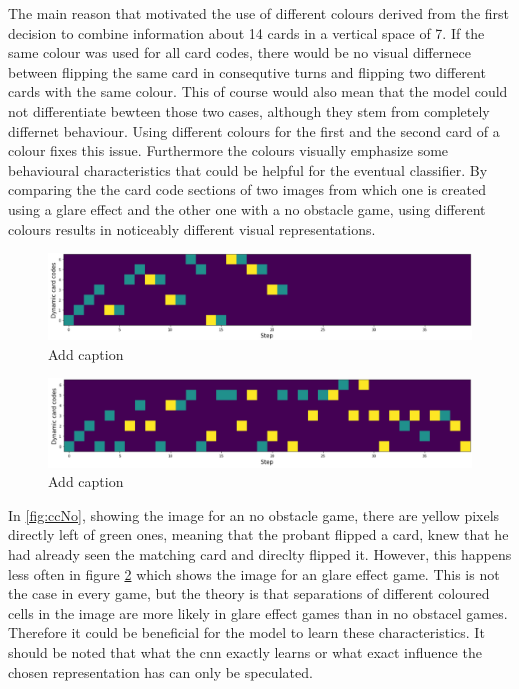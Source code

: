 The main reason that motivated the use of different colours derived from the first decision to combine information about 14 cards in a vertical space of 7. If the same colour was used for all card codes, there would be no visual differnece between flipping the same card in consequtive turns and flipping two different cards with the same colour. This of course would also mean that the model could not differentiate bewteen those two cases, although they stem from completely differnet behaviour. Using different colours for the first and the second card of a colour fixes this issue. Furthermore the colours visually emphasize some behavioural characteristics that could be helpful for the eventual classifier. By comparing the the card code sections of two images from which one is created using a glare effect and the other one with a no obstacle game, using different colours results in noticeably different visual representations. 
\begin{figure}[H]
	\centering
	\includegraphics[width=15cm]{images/cardCodesNoObst.png}
	\caption[Bild kurz]{Add caption}
	\label{fig:ccN}
\end{figure}
\begin{figure}[H]
	\centering
	\includegraphics[width=15cm]{images/cardCodesGlare.png}
	\caption[Bild kurz]{Add caption}
	\label{fig:ccGlare}
\end{figure}
In \ref{fig:ccNo}, showing the image for an no obstacle game, there are yellow pixels directly left of green ones, meaning that the probant flipped a card, knew that he had already seen the matching card and direclty flipped it. However, this happens less often in figure \ref{fig:ccGlare} which shows the image for an glare effect game. This is not the case in every game, but the theory is that separations of different coloured cells in the image are more likely in glare effect games than in no obstacel games. Therefore it could be beneficial for the model to learn these characteristics. It should be noted that what the cnn exactly learns or what exact influence the chosen representation has can only be speculated. 


